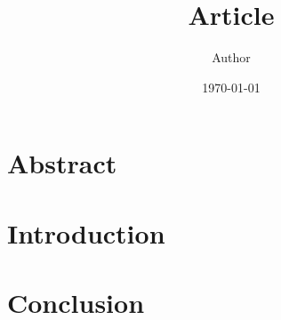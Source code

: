 \documentclass[11pt]{article}
\title{Article}
\author{Author}
\date{\today}
\begin{document}
\maketitle

\section{Abstract}\label{sec:abstract}

\section{Introduction}\label{sec:introduction}

\section{Conclusion}\label{sec:conclusion}
\end{document}
